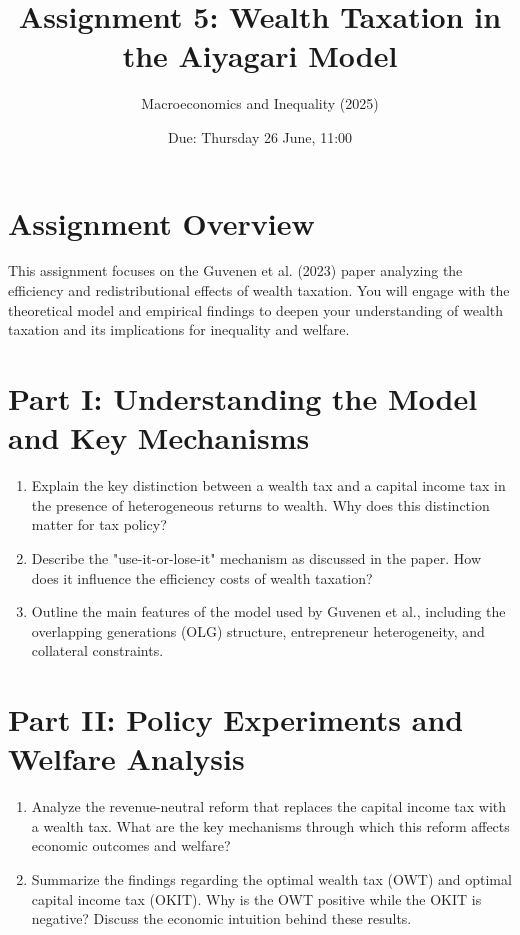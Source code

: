 \documentclass[12pt]{article}
\title{Assignment 5: Wealth Taxation in the Aiyagari Model}
\author{Macroeconomics and Inequality (2025)}
\date{Due: Thursday 26 June, 11:00}
\begin{document}
\maketitle

\section*{Assignment Overview}

This assignment focuses on the Guvenen et al. (2023) paper analyzing the efficiency and redistributional effects of wealth taxation. You will engage with the theoretical model and empirical findings to deepen your understanding of wealth taxation and its implications for inequality and welfare.

\section*{Part I: Understanding the Model and Key Mechanisms}

\begin{enumerate}
    \item Explain the key distinction between a wealth tax and a capital income tax in the presence of heterogeneous returns to wealth. Why does this distinction matter for tax policy?
    \item Describe the "use-it-or-lose-it" mechanism as discussed in the paper. How does it influence the efficiency costs of wealth taxation?
    \item Outline the main features of the model used by Guvenen et al., including the overlapping generations (OLG) structure, entrepreneur heterogeneity, and collateral constraints.
\end{enumerate}

\section*{Part II: Policy Experiments and Welfare Analysis}

\begin{enumerate}
    \item Analyze the revenue-neutral reform that replaces the capital income tax with a wealth tax. What are the key mechanisms through which this reform affects economic outcomes and welfare?
    \item Summarize the findings regarding the optimal wealth tax (OWT) and optimal capital income tax (OKIT). Why is the OWT positive while the OKIT is negative? Discuss the economic intuition behind these results.
\end{enumerate}
\end{document}
